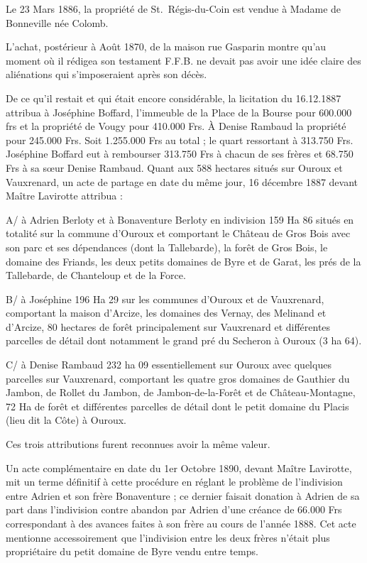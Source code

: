 \documentclass[11pt,a4paper]{report}
\begin{document}
Le 23 Mars 1886, la propriété de St.~Régis-du-Coin est vendue à Madame de Bonneville née Colomb.

L'achat, postérieur à Août 1870, de la maison rue Gasparin montre qu'au moment où il rédigea son testament F.F.B. ne devait pas avoir une idée claire des aliénations qui s'imposeraient après son décès.

De ce qu'il restait et qui était encore considérable, la licitation du 16.12.1887 attribua à Joséphine Boffard, l'immeuble de la Place de la Bourse pour 600.000 frs et la propriété de Vougy pour 410.000 Frs. À Denise Rambaud la propriété pour 245.000 Frs. Soit 1.255.000 Frs au total ; le quart ressortant à 313.750 Frs. Joséphine Boffard eut à rembourser 313.750 Frs à chacun de ses frères et 68.750 Frs à sa sœur Denise Rambaud. Quant aux 588 hectares situés sur Ouroux et Vauxrenard, un acte de partage en date du même jour, 16 décembre 1887 devant Maître Lavirotte attribua :

A/ à Adrien Berloty et à Bonaventure Berloty en indivision 159 Ha 86 situés en totalité sur la commune d'Ouroux et comportant le Château de Gros Bois avec son parc et ses dépendances (dont la Tallebarde), la forêt de Gros Bois, le domaine des Friands, les deux petits domaines de Byre et de Garat, les prés de la Tallebarde, de Chanteloup et de la Force.

B/ à Joséphine 196 Ha 29 sur les communes d'Ouroux et de Vauxrenard, comportant la maison d'Arcize, les domaines des Vernay, des Melinand et d'Arcize, 80 hectares de forêt principalement sur Vauxrenard et différentes parcelles de détail dont notamment le grand pré du Secheron à Ouroux (3 ha 64).

C/ à Denise Rambaud 232 ha 09 essentiellement sur Ouroux avec quelques parcelles sur Vauxrenard, comportant les quatre gros domaines de Gauthier du Jambon, de Rollet du Jambon, de Jambon-de-la-Forêt et de Château-Montagne, 72 Ha de forêt et différentes parcelles de détail dont le petit domaine du Placis (lieu dit la Côte) à Ouroux.

Ces trois attributions furent reconnues avoir la même valeur.

Un acte complémentaire en date du 1er Octobre 1890, devant Maître Lavirotte, mit un terme définitif à cette procédure en réglant le problème de l'indivision entre Adrien et son frère Bonaventure ; ce dernier faisait donation à Adrien de sa part dans l'indivision contre abandon par Adrien d'une créance de 66.000 Frs correspondant à des avances faites à son frère au cours de l'année 1888. Cet acte mentionne accessoirement que l'indivision entre les deux frères n'était plus propriétaire du petit domaine de Byre vendu entre temps.
\end{document}
